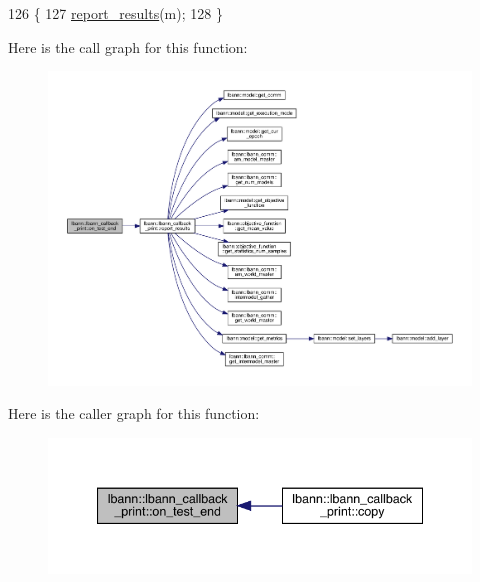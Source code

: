 \begin{DoxyCode}
126                                                \{
127   \hyperlink{classlbann_1_1lbann__callback__print_a50117faa3edb961ddd87c5c5806820b2}{report\_results}(m);
128 \}
\end{DoxyCode}
Here is the call graph for this function\+:\nopagebreak
\begin{figure}[H]
\begin{center}
\leavevmode
\includegraphics[width=350pt]{classlbann_1_1lbann__callback__print_a1f72a486004af859823f75c311dcff42_cgraph}
\end{center}
\end{figure}
Here is the caller graph for this function\+:\nopagebreak
\begin{figure}[H]
\begin{center}
\leavevmode
\includegraphics[width=340pt]{classlbann_1_1lbann__callback__print_a1f72a486004af859823f75c311dcff42_icgraph}
\end{center}
\end{figure}
\mbox{\label{classlbann_1_1lbann__callback__print_a7090572e2f89e7994872b5fdb612dd3f}} 
